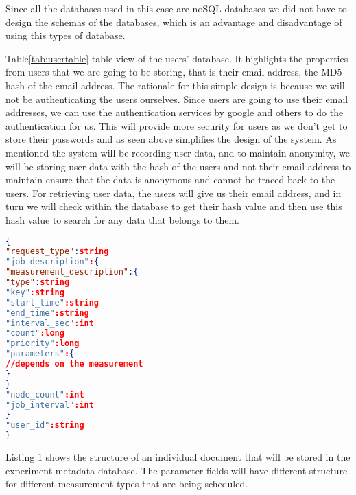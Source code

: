 Since all the databases used in this case are noSQL databases we did not have to design the schemas of the databases, which is an advantage and disadvantage of using this types of database.
\begin{table}[h!]
        \caption{Table showing a table view of the Users database, highlighting the properties stored in the database.}
        \label{tab:usertable}
\end{table}
Table\ref{tab:usertable} table view of the users' database.
It highlights the properties from users that we are going to be storing, that is their email address, the MD5 hash of the email address.
The rationale for this simple design is because we will not be authenticating the users ourselves.
Since users are going to use their email addresses, we can use the authentication services by google and others to do the authentication for us.
This will provide more security for users as we don't get to store their passwords and as seen above simplifies the design of the system.
As mentioned the system will be recording user data, and to maintain anonymity, we will be storing user data with the hash of the users and not their email address to maintain ensure that the data is anonymous and cannot be traced back to the users.
For retrieving user data, the users will give us their email address, and in turn we will check within the database to get their hash value and then use this hash value to search for any data that belongs to them.
\begin{lstlisting}[language=json, caption=JSON structure showing how the experiment metada documetns stored in the database will look like]
{
"request_type":string
"job_description":{
"measurement_description":{
"type":string
"key":string
"start_time":string
"end_time":string
"interval_sec":int
"count":long
"priority":long
"parameters":{
//depends on the measurement
}
}
"node_count":int
"job_interval":int
}
"user_id":string
}
\end{lstlisting}
Listing 1 shows the structure of an individual document that will be stored in the experiment metadata database.
The parameter fields will have different structure for different measurement types that are being scheduled.
